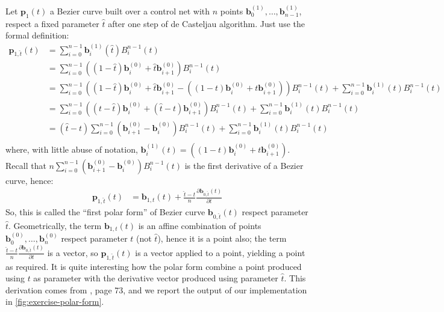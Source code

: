 \documentclass{article}
\begin{document}
Let $\mathbf{p}_{1}(t)$ a Bezier curve built over a control net with $n$ points
$\mathbf{b}_{0}^{(1)},\ldots,\mathbf{b}_{n-1}^{(1)}$, respect a fixed parameter $\hat{t}$
after one step of de Casteljau algorithm. Just use the formal definition:
\begin{displaymath}
    \begin{split}
        \mathbf{p}_{1,\hat{t}}(t)  &= \sum_{i=0}^{n-1}{\mathbf{b}_{i}^{(1)}(\hat{t})B_{i}^{n-1}(t)} \\
            &=  \sum_{i=0}^{n-1}{\left( (1-\hat{t})\mathbf{b}_{i}^{(0)} +
                \hat{t}\mathbf{b}_{i+1}^{(0)}\right)B_{i}^{n-1}(t)} \\
            &=  \sum_{i=0}^{n-1}{\left( (1-\hat{t})\mathbf{b}_{i}^{(0)} +
                \hat{t}\mathbf{b}_{i+1}^{(0)} -\left( (1-t)\mathbf{b}_{i}^{(0)} +
                t\mathbf{b}_{i+1}^{(0)}\right)\right)B_{i}^{n-1}(t)} +
                \sum_{i=0}^{n-1}{\mathbf{b}_{i}^{(1)}(t)B_{i}^{n-1}(t)} \\
            &=  \sum_{i=0}^{n-1}{\left( (t-\hat{t})\mathbf{b}_{i}^{(0)} +
                (\hat{t}-t)\mathbf{b}_{i+1}^{(0)}\right)B_{i}^{n-1}(t)} +
                \sum_{i=0}^{n-1}{\mathbf{b}_{i}^{(1)}(t)B_{i}^{n-1}(t)} \\
            &=  (\hat{t}-t)\sum_{i=0}^{n-1}{\left(
                \mathbf{b}_{i+1}^{(0)} - \mathbf{b}_{i}^{(0)}\right)B_{i}^{n-1}(t)} +
                \sum_{i=0}^{n-1}{\mathbf{b}_{i}^{(1)}(t)B_{i}^{n-1}(t)} \\
    \end{split}
\end{displaymath}
where, with little abuse of notation, $\mathbf{b}_{i}^{(1)}(t) =
\left( (1-t)\mathbf{b}_{i}^{(0)} + t\mathbf{b}_{i+1}^{(0)}\right)$.
Recall that $n\sum_{i=0}^{n-1}{\left(
\mathbf{b}_{i+1}^{(0)} - \mathbf{b}_{i}^{(0)}\right)B_{i}^{n-1}(t)}$ is the
first derivative of a Bezier curve, hence:
\begin{displaymath}
    \begin{split}
        \mathbf{p}_{1, \hat{t}}(t)  &= \mathbf{b}_{1, t}(t) +
        \frac{\hat{t}-t}{n}\frac{\partial \mathbf{b}_{0, \hat{t}}(t) }{\partial t}
    \end{split}
\end{displaymath}
So, this is called the ``first polar form'' of Bezier curve $\mathbf{b}_{0, \hat{t}}(t)$
respect parameter $\hat{t}$. Geometrically, the term $\mathbf{b}_{1, t}(t)$ is an affine
combination of points $\mathbf{b}_{0}^{(0)},\ldots,\mathbf{b}_{n}^{(0)}$ respect parameter
$t$ (not $\hat{t}$), hence it is a point also; the term
        $\frac{\hat{t}-t}{n}\frac{\partial \mathbf{b}_{0, \hat{t}}(t) }{\partial t} $
is a vector, so $\mathbf{p}_{1, \hat{t}}(t)$ is a vector applied to a point, yielding a point
as required. It is quite interesting how the polar form combine a point produced using $t$
as parameter with the derivative vector produced using  parameter $\hat{t}$. This derivation
comes from \cite{Farin}, page 73, and we report the output of our implementation in
\autoref{fig:exercise-polar-form}.
\end{document}
